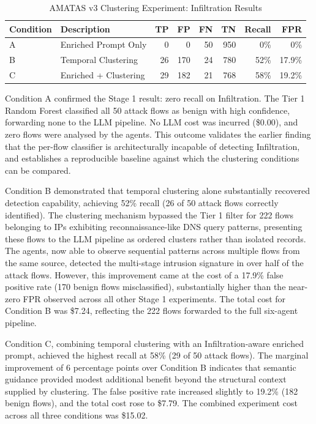 \begin{table}[H]
\centering
\caption{AMATAS v3 Clustering Experiment: Infiltration Results}
\label{tab:v3-clustering}
\begin{tabularx}{\textwidth}{l l r r r r r r}
\toprule
Condition & Description & TP & FP & FN & TN & Recall & FPR \\
\midrule
A & Enriched Prompt Only    & 0  & 0   & 50 & 950 & 0\%  & 0\% \\
B & Temporal Clustering     & 26 & 170 & 24 & 780 & 52\% & 17.9\% \\
C & Enriched + Clustering   & 29 & 182 & 21 & 768 & 58\% & 19.2\% \\
\bottomrule
\end{tabularx}
\end{table}

Condition A confirmed the Stage 1 result: zero recall on Infiltration. The Tier 1 Random Forest classified all 50 attack flows as benign with high confidence, forwarding none to the LLM pipeline. No LLM cost was incurred (\$0.00), and zero flows were analysed by the agents. This outcome validates the earlier finding that the per-flow classifier is architecturally incapable of detecting Infiltration, and establishes a reproducible baseline against which the clustering conditions can be compared.

Condition B demonstrated that temporal clustering alone substantially recovered detection capability, achieving 52\% recall (26 of 50 attack flows correctly identified). The clustering mechanism bypassed the Tier 1 filter for 222 flows belonging to IPs exhibiting reconnaissance-like DNS query patterns, presenting these flows to the LLM pipeline as ordered clusters rather than isolated records. The agents, now able to observe sequential patterns across multiple flows from the same source, detected the multi-stage intrusion signature in over half of the attack flows. However, this improvement came at the cost of a 17.9\% false positive rate (170 benign flows misclassified), substantially higher than the near-zero FPR observed across all other Stage 1 experiments. The total cost for Condition B was \$7.24, reflecting the 222 flows forwarded to the full six-agent pipeline.

Condition C, combining temporal clustering with an Infiltration-aware enriched prompt, achieved the highest recall at 58\% (29 of 50 attack flows). The marginal improvement of 6 percentage points over Condition B indicates that semantic guidance provided modest additional benefit beyond the structural context supplied by clustering. The false positive rate increased slightly to 19.2\% (182 benign flows), and the total cost rose to \$7.79. The combined experiment cost across all three conditions was \$15.02.

